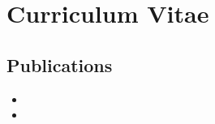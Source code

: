 \chapter*{Curriculum Vitae}


\section*{Publications}

\begin{itemize}
	\item {}
	\item {}
\end{itemize}